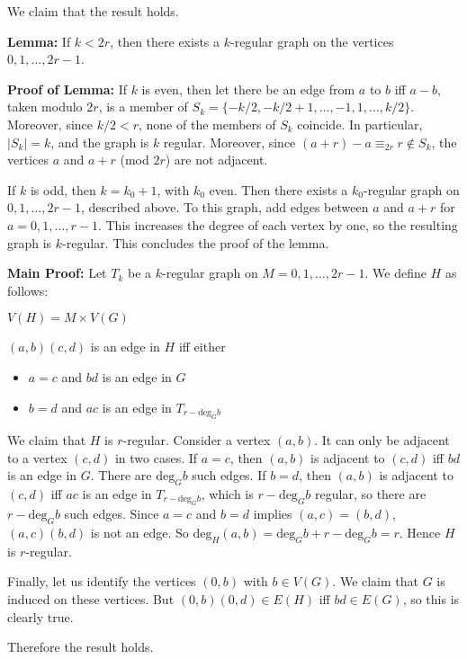 We claim that the result holds.

{\bf Lemma:} If $k<2r$, then there exists a $k$-regular graph on the vertices
$0,1,\dots,2r-1$.

{\bf Proof of Lemma:} If $k$ is even, then let there be an edge from $a$ to $b$
iff $a-b$, taken modulo $2r$, is a member of $S_k=\{-k/2,-k/2+1,\dots,-1,1,\dots,k/2\}$. 
Moreover, since $k/2<r$, none of the members of $S_k$ coincide. In particular,
$|S_k|=k$, and the graph is $k$ regular. Moreover, since $(a+r)-a\equiv_{2r}r \notin S_k$,
the vertices $a$ and $a+r$ (mod $2r$) are not adjacent.

If $k$ is odd, then $k=k_0+1$, with $k_0$ even. Then there exists a $k_0$-regular graph
on $0,1,\dots,2r-1$, described above. To this graph, add edges between $a$ and $a+r$ for
$a=0,1,\dots,r-1$. This increases the degree of each vertex by one, so the resulting graph
is $k$-regular. This concludes the proof of the lemma.

{\bf Main Proof:} Let $T_k$ be a $k$-regular graph on $M=0,1,\dots,2r-1$. We define
$H$ as follows:

$V(H)=M\times V(G)$

$(a,b)(c,d)$ is an edge in $H$ iff either
\begin{itemize}
\item $a=c$ and $bd$ is an edge in $G$
\item $b=d$ and $ac$ is an edge in $T_{r-\text{deg}_G b}$
\end{itemize}
We claim that $H$ is $r$-regular. Consider a vertex $(a,b)$. It can only be adjacent
to a vertex $(c,d)$ in two cases. If $a=c$, then $(a,b)$ is adjacent to $(c,d)$ iff
$bd$ is an edge in $G$. There are $\text{deg}_G b$ such edges. If $b=d$, then $(a,b)$
is adjacent to $(c,d)$ iff $ac$ is an edge in $T_{r-\text{deg}_G b}$, which is
$r-\text{deg}_G b$ regular, so there are $r-\text{deg}_G b$ such edges.
Since $a=c$ and $b=d$ implies $(a,c)=(b,d)$, $(a,c)(b,d)$ is not an edge.
So $\text{deg}_H (a,b) = \text{deg}_G b + r-\text{deg}_G b = r$. Hence $H$ is
$r$-regular.

Finally, let us identify the vertices $(0,b)$ with $b\in V(G)$. We claim that $G$
is induced on these vertices. But $(0,b)(0,d)\in E(H)$ iff $bd \in E(G)$, so this
is clearly true.

Therefore the result holds.

